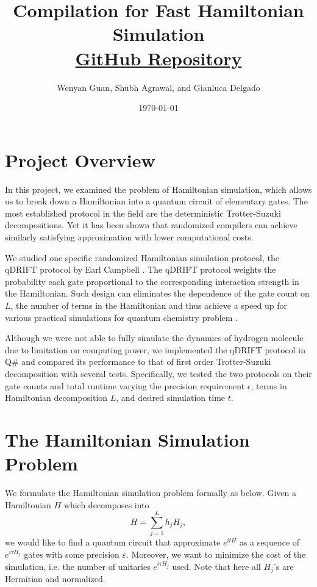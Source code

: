 \documentclass[letterpaper, 11pt]{article}
\begin{document}
\title{Compilation for Fast Hamiltonian Simulation \\
\large \href{https://github.com/gianelgado12/cs101-Fast-Hamiltonian-Project}{GitHub Repository}
}
\author{Wenyan Guan, Shubh Agrawal, and Gianluca Delgado}
\date{\today}
\maketitle



\section*{Project Overview}
In this project, we examined the problem of Hamiltonian simulation, which allows us to break down a Hamiltonian into a quantum circuit of elementary gates. The most established protocol in the field are the deterministic Trotter-Suzuki decompositions. Yet it has been shown that randomized compilers can achieve similarly satisfying approximation with lower computational costs. 

We studied one specific randomized Hamiltonian simulation protocol, the qDRIFT protocol by Earl Campbell \cite{PhysRevLett.123.070503}. The qDRIFT protocol weights the probability each gate proportional to the corresponding interaction strength in the Hamiltonian. Such design can eliminates the dependence of the gate count on $L$, the number of terms in the Hamiltonian and thus achieve a speed up for various practical simulations for quantum chemistry problem \cite{PhysRevLett.123.070503}.

Although we were not able to fully simulate the dynamics of hydrogen molecule due to limitation on computing power, we implemented the qDRIFT protocol in Q\# and compared its performance to that of first order Trotter-Suzuki decomposition \cite{nathanwiebe2} with several tests. Specifically, we tested the two protocols on their gate counts and total runtime varying the precision requirement $\epsilon$, terms in Hamiltonian decomposition $L$, and desired simulation time $t$.

\section*{The Hamiltonian Simulation Problem}
We formulate the Hamiltonian simulation problem formally as below. Given a Hamiltonian $H$ which decomposes into 
\begin{equation}
    H = \sum_{j = 1}^{L} h_j H_j,
\end{equation}
we would like to find a quantum circuit that approximate $e^{itH}$ as a sequence of $e^{i \tau H_j}$ gates with some precision $\varepsilon$. Moreover, we want to minimize the cost of the simulation, i.e. the number of unitaries $e^{i \tau H_j}$ used. Note that here all $H_j$'s are Hermitian and normalized.
\end{document}
